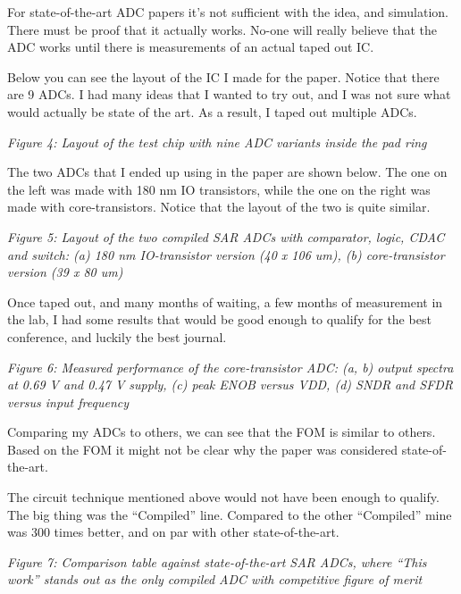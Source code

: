 For state-of-the-art ADC papers it's not sufficient with the idea, and
simulation. There must be proof that it actually works. No-one will
really believe that the ADC works until there is measurements of an
actual taped out IC.

Below you can see the layout of the IC I made for the paper. Notice that
there are 9 ADCs. I had many ideas that I wanted to try out, and I was
not sure what would actually be state of the art. As a result, I taped
out multiple ADCs.


{
\centering
{}
}

\emph{Figure 4: Layout of the test chip with nine ADC variants inside
the pad ring}

The two ADCs that I ended up using in the paper are shown below. The one
on the left was made with 180 nm IO transistors, while the one on the
right was made with core-transistors. Notice that the layout of the two
is quite similar.


{
\centering
{}
}

\emph{Figure 5: Layout of the two compiled SAR ADCs with comparator,
logic, CDAC and switch: (a) 180 nm IO-transistor version (40 x 106 um),
(b) core-transistor version (39 x 80 um)}

Once taped out, and many months of waiting, a few months of measurement
in the lab, I had some results that would be good enough to qualify for
the best conference, and luckily the best journal.


{
\centering
{}
}

\emph{Figure 6: Measured performance of the core-transistor ADC: (a, b)
output spectra at 0.69 V and 0.47 V supply, (c) peak ENOB versus VDD,
(d) SNDR and SFDR versus input frequency}

Comparing my ADCs to others, we can see that the FOM is similar to
others. Based on the FOM it might not be clear why the paper was
considered state-of-the-art.

The circuit technique mentioned above would not have been enough to
qualify. The big thing was the ``Compiled'' line. Compared to the other
``Compiled'' mine was 300 times better, and on par with other
state-of-the-art.


{
\centering
{}
}

\emph{Figure 7: Comparison table against state-of-the-art SAR ADCs,
where ``This work'' stands out as the only compiled ADC with competitive
figure of merit}

